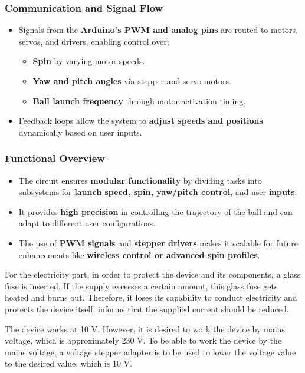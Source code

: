 \documentclass[12pt]{article}
\begin{document}
\subsubsection{Communication and Signal Flow}

\begin{itemize}
    \item Signals from the \textbf{Arduino’s PWM and analog pins} are routed to motors, servos, and drivers, enabling control over:
    \begin{itemize}
        \item \textbf{Spin} by varying motor speeds.
        \item \textbf{Yaw and pitch angles} via stepper and servo motors.
        \item \textbf{Ball launch frequency} through motor activation timing.
    \end{itemize}
    \item Feedback loops allow the system to \textbf{adjust speeds and positions} dynamically based on user inputs.
\end{itemize}

\subsubsection{Functional Overview}

\begin{itemize}
    \item The circuit ensures \textbf{modular functionality} by dividing tasks into subsystems for \textbf{launch speed, spin, yaw/pitch control}, and user \textbf{inputs}.
    \item It provides \textbf{high precision} in controlling the trajectory of the ball and can adapt to different user configurations.
    \item The use of \textbf{PWM signals} and \textbf{stepper drivers} makes it scalable for future enhancements like \textbf{wireless control or advanced spin profiles}.
\end{itemize}

For the electricity part, in order to protect the device and its components, a glass fuse is inserted. If the supply excesses a certain amount, this glass fuse gets heated and burns out. Therefore, it loses its capability to conduct electricity and protects the device itself. informs that the supplied current should be reduced. 

The device works at 10 V. However, it is desired to work the device by mains voltage, which is approximately 230 V. To be able to work the device by the mains voltage, a voltage stepper adapter is to be used to lower the voltage value to the desired value, which is 10 V.
\end{document}
